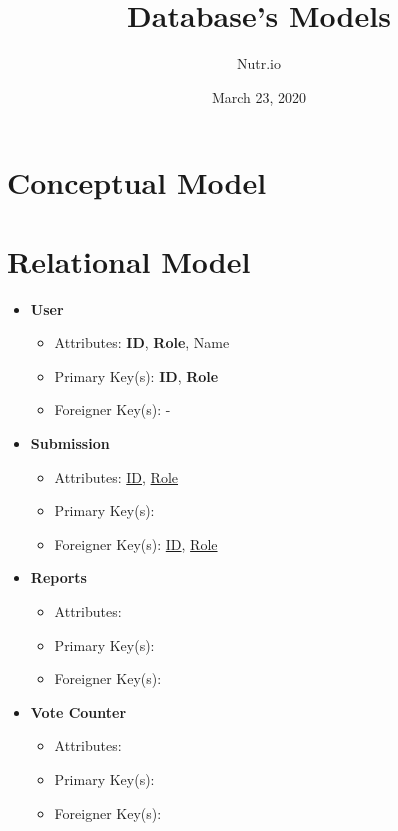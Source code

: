 \documentclass{article}
\title{Database's Models}
\date{March 23, 2020}
\author{Nutr.io}
\begin{document}
\maketitle

\section{Conceptual Model}

\section{Relational Model}
    \begin{itemize}
        \item \textbf{User}        
        \begin{itemize}
            \item Attributes: \textbf{ID}, \textbf{Role}, Name
            \item Primary Key(s): \textbf{ID}, \textbf{Role}
            \item Foreigner Key(s): -
        \end{itemize}

        \item \textbf{Submission}                
        \begin{itemize}
            \item Attributes: \underline{ID}, \underline{Role}
            \item Primary Key(s): 
            \item Foreigner Key(s): \underline{ID}, \underline{Role}
        \end{itemize}

        \item \textbf{Reports}
        \begin{itemize}
            \item Attributes: 
            \item Primary Key(s): 
            \item Foreigner Key(s): 
        \end{itemize}
            
        \item \textbf{Vote Counter}
        \begin{itemize}
            \item Attributes: 
            \item Primary Key(s): 
            \item Foreigner Key(s):
        \end{itemize}


\end{itemize}
\end{document}
